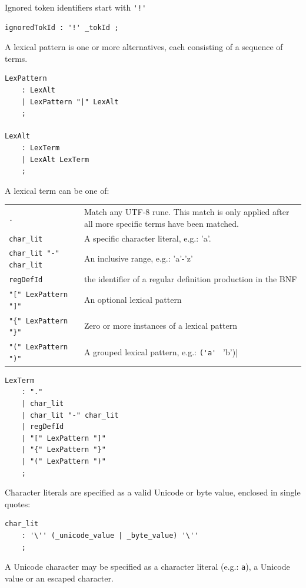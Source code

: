 \documentclass[12pt]{article}
\begin{document}
Ignored token identifiers start with \verb|'!'|

\begin{Verbatim}[frame=single]
ignoredTokId : '!' _tokId ;
\end{Verbatim}

A lexical pattern is one or more alternatives, each consisting of a sequence of terms.

\begin{Verbatim}[frame=single]
LexPattern
    : LexAlt
    | LexPattern "|" LexAlt
    ;

LexAlt
    : LexTerm
    | LexAlt LexTerm
    ;
\end{Verbatim}

A lexical term can be one of:

\begin{longtable}{lp{12cm}}
	\verb|.| & Match any UTF-8 rune. This match is only applied after all more specific terms have been matched. \\
	\verb|char_lit| & A specific character literal, e.g.: 'a'. \\
	\verb|char_lit "-" char_lit| & An inclusive range, e.g.: 'a'-'z' \\
	\verb|regDefId| & the identifier of a regular definition production in the BNF \\
	\verb|"[" LexPattern "]"| & An optional lexical pattern \\
	\verb|"{" LexPattern "}"| & Zero or more instances of a lexical pattern \\
	\verb|"(" LexPattern ")"| & A grouped lexical pattern, e.g.: \verb|('a' | 'b')| \\
\end{longtable}

\begin{Verbatim}[frame=single]
LexTerm
    : "."
    | char_lit
    | char_lit "-" char_lit
    | regDefId
    | "[" LexPattern "]"
    | "{" LexPattern "}"
    | "(" LexPattern ")"
    ;
\end{Verbatim}

Character literals are specified as a valid Unicode or byte value, enclosed in single quotes:

\begin{Verbatim}[frame=single]
char_lit
    : '\'' (_unicode_value | _byte_value) '\''
    ;
\end{Verbatim}

A Unicode character may be specified as a character literal (e.g.: \verb'a'), a Unicode value or an escaped character.
\end{document}
